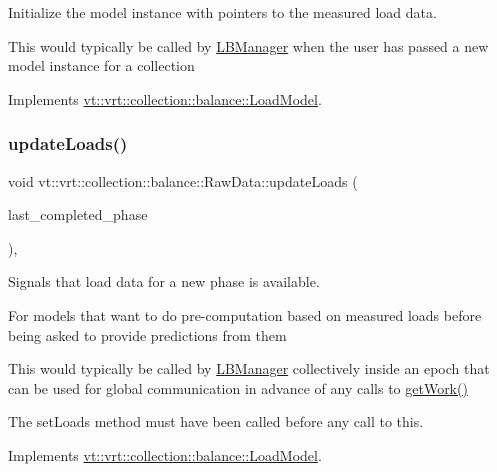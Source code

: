 Initialize the model instance with pointers to the measured load data. 

This would typically be called by \hyperlink{structvt_1_1vrt_1_1collection_1_1balance_1_1_l_b_manager}{L\+B\+Manager} when the user has passed a new model instance for a collection 

Implements \hyperlink{structvt_1_1vrt_1_1collection_1_1balance_1_1_load_model_a07512b8d95025a21a7c25cc3fdb817ad}{vt\+::vrt\+::collection\+::balance\+::\+Load\+Model}.

\mbox{\label{structvt_1_1vrt_1_1collection_1_1balance_1_1_raw_data_a4aaae24a53ead0248b873911ce560a34}} 
\subsubsection{\texorpdfstring{update\+Loads()}{updateLoads()}}
{\footnotesize\ttfamily void vt\+::vrt\+::collection\+::balance\+::\+Raw\+Data\+::update\+Loads (\begin{DoxyParamCaption}\item[{\hyperlink{namespacevt_a46ce6733d5cdbd735d561b7b4029f6d7}{Phase\+Type}}]{last\+\_\+completed\+\_\+phase }\end{DoxyParamCaption})\hspace{0.3cm}{\ttfamily [override]}, {\ttfamily [virtual]}}



Signals that load data for a new phase is available. 

For models that want to do pre-\/computation based on measured loads before being asked to provide predictions from them

This would typically be called by \hyperlink{structvt_1_1vrt_1_1collection_1_1balance_1_1_l_b_manager}{L\+B\+Manager} collectively inside an epoch that can be used for global communication in advance of any calls to \hyperlink{structvt_1_1vrt_1_1collection_1_1balance_1_1_raw_data_a2fc0e286efee8f9950a7a8ff13f3261d}{get\+Work()}

The {\ttfamily set\+Loads} method must have been called before any call to this. 

Implements \hyperlink{structvt_1_1vrt_1_1collection_1_1balance_1_1_load_model_a4f1c6fb5d7d7a0b147755f025b1d5f5c}{vt\+::vrt\+::collection\+::balance\+::\+Load\+Model}.



